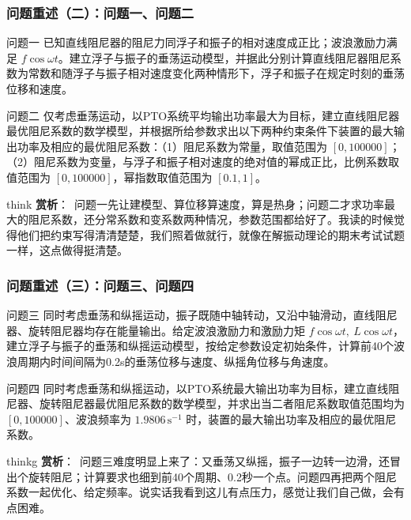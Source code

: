 \documentclass[aspectratio=169]{beamer}
\newcommand{\remark}[2]{%
	\vspace{0.12cm}%
	\begin{beamercolorbox}[rounded=true,sep=6pt]{think}%
		{\color{orchidpurple}\textbf{#1}：}~#2%
	\end{beamercolorbox}%
}
\newcommand{\remarkg}[2]{%
	\vspace{0.12cm}%
	\begin{beamercolorbox}[rounded=true,sep=6pt]{thinkg}%
		{\color{orchidgold}\textbf{#1}：}~#2%
	\end{beamercolorbox}%
}
\begin{document}
\begin{frame}
	\frametitle{问题重述（二）：问题一、问题二}
	\scriptsize
	\begin{block}{问题一}
		已知直线阻尼器的阻尼力同浮子和振子的相对速度成正比；波浪激励力满足 $f\cos\omega t$。建立浮子与振子的垂荡运动模型，并据此分别计算直线阻尼器阻尼系数为常数和随浮子与振子相对速度变化两种情形下，浮子和振子在规定时刻的垂荡位移和速度。
	\end{block}
	\begin{block}{问题二}
		仅考虑垂荡运动，以PTO系统平均输出功率最大为目标，建立直线阻尼器最优阻尼系数的数学模型，并根据所给参数求出以下两种约束条件下装置的最大输出功率及相应的最优阻尼系数：（1）阻尼系数为常量，取值范围为 $[0,100000]$；（2）阻尼系数为变量，与浮子和振子相对速度的绝对值的幂成正比，比例系数取值范围为 $[0,100000]$，幂指数取值范围为 $[0.1,1]$。
	\end{block}
	\medskip
	\remark{赏析}{问题一先让建模型、算位移算速度，算是热身；问题二才求功率最大的阻尼系数，还分常系数和变系数两种情况，参数范围都给好了。我读的时候觉得他们把约束写得清清楚楚，我们照着做就行，就像在解振动理论的期末考试试题一样，这点做得挺清楚。}
\end{frame}

\begin{frame}
	\frametitle{问题重述（三）：问题三、问题四}
	\scriptsize
	\begin{block}{问题三}
		同时考虑垂荡和纵摇运动，振子既随中轴转动，又沿中轴滑动，直线阻尼器、旋转阻尼器均存在能量输出。给定波浪激励力和激励力矩 $f\cos\omega t,\ L\cos\omega t$，建立浮子与振子的垂荡和纵摇运动模型，按给定参数设定初始条件，计算前40个波浪周期内时间间隔为0.2s的垂荡位移与速度、纵摇角位移与角速度。
	\end{block}
	\begin{block}{问题四}
		同时考虑垂荡和纵摇运动，以PTO系统最大输出功率为目标，建立直线阻尼器、旋转阻尼器最优阻尼系数的数学模型，并求出当二者阻尼系数取值范围均为 $[0,100000]$、波浪频率为 $1.9806\,\mathrm{s}^{-1}$ 时，装置的最大输出功率及相应的最优阻尼系数。
	\end{block}
	\medskip
	\remarkg{赏析}{问题三难度明显上来了：又垂荡又纵摇，振子一边转一边滑，还冒出个旋转阻尼；计算要求也细到前40个周期、0.2秒一个点。问题四再把两个阻尼系数一起优化、给定频率。说实话我看到这儿有点压力，感觉让我们自己做，会有点困难。}
\end{frame}
\end{document}
